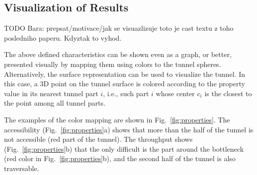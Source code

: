 \documentclass[usletter, 10pt, conference]{ieeeconf} %
\begin{document}
\subsection{Visualization of Results}

TODO Bara: prepsat/motivace/jak se visuazlizuje
toto je cast textu z toho posledniho paperu. Kdyztak to vyhod.

The above defined characteristics can be shown even as a graph, or better, presented visually by mapping them using colors to the tunnel spheres.
 Alternatively, the surface representation can be used to visualize the tunnel.
In this case, a 3D point on the tunnel surface is colored according to the property value in its nearest tunnel part $i$,  i.e., such part $i$ whose center $c_i$ is the closest to the point among all tunnel parts.

The examples of the color mapping are shown in Fig.~\ref{fig:properties}.
The accessibility (Fig.~\ref{fig:properties}a) shows that more than the half of the tunnel is not accessible (red part of the tunnel).
The throughput shows (Fig.~\ref{fig:properties}b) that the only difficult is the part around the bottleneck (red color in Fig.~\ref{fig:properties}b), and the second half of the tunnel is also traversable.
\end{document}
